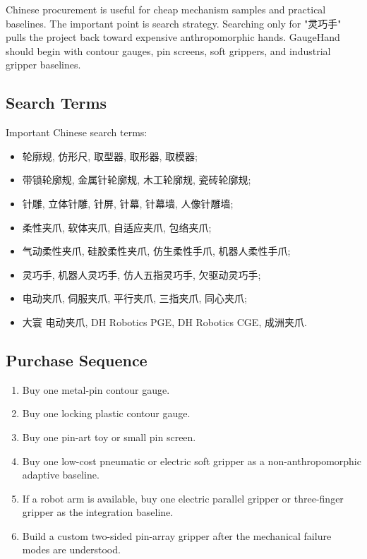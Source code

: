 \documentclass[11pt]{article}
\newcommand{\GaugeHand}{GaugeHand}
\begin{document}
Chinese procurement is useful for cheap mechanism samples and practical baselines. The important point is search strategy. Searching only for "灵巧手" pulls the project back toward expensive anthropomorphic hands. \GaugeHand{} should begin with contour gauges, pin screens, soft grippers, and industrial gripper baselines.

\subsection{Search Terms}

Important Chinese search terms:

\begin{itemize}
  \item 轮廓规, 仿形尺, 取型器, 取形器, 取模器;
  \item 带锁轮廓规, 金属针轮廓规, 木工轮廓规, 瓷砖轮廓规;
  \item 针雕, 立体针雕, 针屏, 针幕, 针幕墙, 人像针雕墙;
  \item 柔性夹爪, 软体夹爪, 自适应夹爪, 包络夹爪;
  \item 气动柔性夹爪, 硅胶柔性夹爪, 仿生柔性手爪, 机器人柔性手爪;
  \item 灵巧手, 机器人灵巧手, 仿人五指灵巧手, 欠驱动灵巧手;
  \item 电动夹爪, 伺服夹爪, 平行夹爪, 三指夹爪, 同心夹爪;
  \item 大寰 电动夹爪, DH Robotics PGE, DH Robotics CGE, 成洲夹爪.
\end{itemize}

\subsection{Purchase Sequence}

\begin{enumerate}
  \item Buy one metal-pin contour gauge.
  \item Buy one locking plastic contour gauge.
  \item Buy one pin-art toy or small pin screen.
  \item Buy one low-cost pneumatic or electric soft gripper as a non-anthropomorphic adaptive baseline.
  \item If a robot arm is available, buy one electric parallel gripper or three-finger gripper as the integration baseline.
  \item Build a custom two-sided pin-array gripper after the mechanical failure modes are understood.
\end{enumerate}
\end{document}
